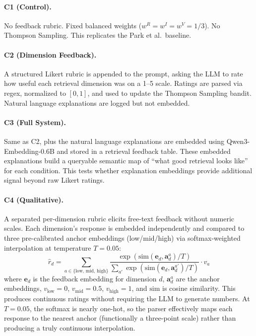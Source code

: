\paragraph{C1 (Control).}
No feedback rubric. Fixed balanced weights ($w^R = w^I = w^V = 1/3$). No Thompson Sampling.
This replicates the Park et al.\ baseline.

\paragraph{C2 (Dimension Feedback).}
A structured Likert rubric is appended to the prompt, asking the LLM to rate how useful each retrieval dimension was on a 1--5 scale.
Ratings are parsed via regex, normalized to $[0,1]$, and used to update the Thompson Sampling bandit.
Natural language explanations are logged but not embedded.

\paragraph{C3 (Full System).}
Same as C2, plus the natural language explanations are embedded using Qwen3-Embedding-0.6B and stored in a retrieval feedback table.
These embedded explanations build a queryable semantic map of ``what good retrieval looks like'' for each condition.
This tests whether explanation embeddings provide additional signal beyond raw Likert ratings.

\paragraph{C4 (Qualitative).}
A separated per-dimension rubric elicits free-text feedback without numeric scales.
Each dimension's response is embedded independently and compared to three pre-calibrated anchor embeddings (low/mid/high) via softmax-weighted interpolation at temperature $T = 0.05$:
\begin{equation}
\hat{r}_d = \sum_{a \in \{\text{low, mid, high}\}} \frac{\exp(\text{sim}(\mathbf{e}_d, \mathbf{a}_d^a) / T)}{\sum_{a'} \exp(\text{sim}(\mathbf{e}_d, \mathbf{a}_d^{a'}) / T)} \cdot v_a
\label{eq:anchor}
\end{equation}
where $\mathbf{e}_d$ is the feedback embedding for dimension $d$, $\mathbf{a}_d^a$ are the anchor embeddings, $v_{\text{low}}=0$, $v_{\text{mid}}=0.5$, $v_{\text{high}}=1$, and $\text{sim}$ is cosine similarity.
This produces continuous ratings without requiring the LLM to generate numbers.
At $T{=}0.05$, the softmax is nearly one-hot, so the parser effectively maps each response to the nearest anchor (functionally a three-point scale) rather than producing a truly continuous interpolation.

